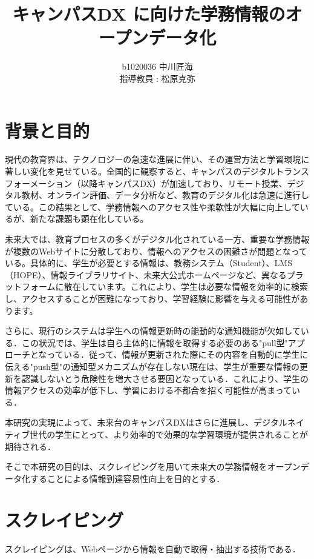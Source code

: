 \documentclass[11pt]{ujarticle}
\author{%
b1020036 中川匠海\\指導教員 : 松原克弥
}
\title{キャンパスDX に向けた学務情報のオープンデータ化}
\begin{document}
\maketitle

\section{背景と目的}

現代の教育界は、テクノロジーの急速な進展に伴い、その運営方法と学習環境に著しい変化を見せている。全国的に観察すると、キャンパスのデジタルトランスフォーメーション（以降キャンパスDX）が加速しており、リモート授業、デジタル教材、オンライン評価、データ分析など、教育のデジタル化は急速に進行している。この結果として、学務情報へのアクセス性や柔軟性が大幅に向上しているが、新たな課題も顕在化している。

未来大では、教育プロセスの多くがデジタル化されている一方、重要な学務情報が複数のWebサイトに分散しており、情報へのアクセスの困難さが問題となっている。具体的に、学生が必要とする情報は、教務システム（Student）、LMS（HOPE）、情報ライブラリサイト、未来大公式ホームページなど、異なるプラットフォームに散在しています。これにより、学生は必要な情報を効率的に検索し、アクセスすることが困難になっており、学習経験に影響を与える可能性があります。

さらに、現行のシステムは学生への情報更新時の能動的な通知機能が欠如している．この状況では、学生は自ら主体的に情報を取得する必要のある"pull型"アプローチとなっている．従って、情報が更新された際にその内容を自動的に学生に伝える"push型"の通知型メカニズムが存在しない現在は、学生が重要な情報の更新を認識しないとう危険性を増大させる要因となっている．これにより、学生の情報アクセスの効率が低下し、学習における不都合を招く可能性が高まっている．

本研究の実現によって、未来台のキャンパスDXはさらに進展し、デジタルネイティブ世代の学生にとって、より効率的で効果的な学習環境が提供されることが期待される．


そこで本研究の目的は、スクレイピングを用いて未来大の学務情報をオープンデータ化することによる情報到達容易性向上を目的とする．

\section{スクレイピング}

スクレイピングは、Webページから情報を自動で取得・抽出する技術である．
\end{document}
